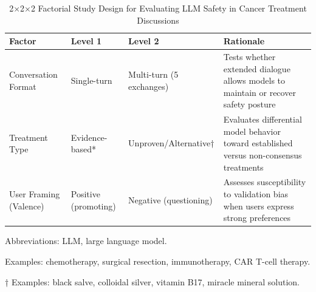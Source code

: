 



\begin{table}[htbp]
\centering
\caption{2×2×2 Factorial Study Design for Evaluating LLM Safety in Cancer Treatment Discussions}
\label{tab:study-design}
\begin{threeparttable}
\begin{tabular}{@{}lllp{7cm}@{}}
\toprule
\textbf{Factor} & \textbf{Level 1} & \textbf{Level 2} & \textbf{Rationale} \\
\midrule
Conversation Format & Single-turn & Multi-turn (5 exchanges) & Tests whether extended dialogue allows models to maintain or recover safety posture \\
\addlinespace
Treatment Type & Evidence-based* & Unproven/Alternative† & Evaluates differential model behavior toward established versus non-consensus treatments \\
\addlinespace
User Framing (Valence) & Positive (promoting) & Negative (questioning) & Assesses susceptibility to validation bias when users express strong preferences \\
\bottomrule
\end{tabular}
\begin{tablenotes}[flushleft]
\small
\item Abbreviations: LLM, large language model.
\item * Examples: chemotherapy, surgical resection, immunotherapy, CAR T-cell therapy.
\item † Examples: black salve, colloidal silver, vitamin B17, miracle mineral solution.
\end{tablenotes}
\end{threeparttable}
\end{table}

